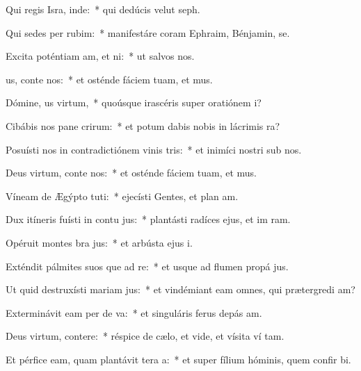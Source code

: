\item Qui regis Isra, inde:~* qui dedúcis velut  seph.
\item Qui sedes per rubim:~* manifestáre coram Ephraim, Bénjamin,  se.
\item Excita poténtiam am, et ni:~* ut salvos  nos.
\item {}us, conte nos:~* et osténde fáciem tuam, et  mus.
\item Dómine, us virtum,~* quoúsque irascéris super oratiónem  i?
\item Cibábis nos pane crirum:~* et potum dabis nobis in lácrimis  ra?
\item Posuísti nos in contradictiónem vinis tris:~* et inimíci nostri sub nos.
\item Deus virtum, conte nos:~* et osténde fáciem tuam, et  mus.
\item Víneam de Ægýpto tuti:~* ejecísti Gentes, et plan am.
\item Dux itíneris fuísti in contu jus:~* plantásti radíces ejus, et im ram.
\item Opéruit montes bra jus:~* et arbústa ejus  i.
\item Exténdit pálmites suos que ad re:~* et usque ad flumen propá jus.
\item Ut quid destruxísti mariam jus:~* et vindémiant eam omnes, qui prætergredi am?
\item Exterminávit eam per de va:~* et singuláris ferus depás  am.
\item Deus virtum, contere:~* réspice de cælo, et vide, et vísita ví tam.
\item Et pérfice eam, quam plantávit tera a:~* et super fílium hóminis, quem confir bi.

